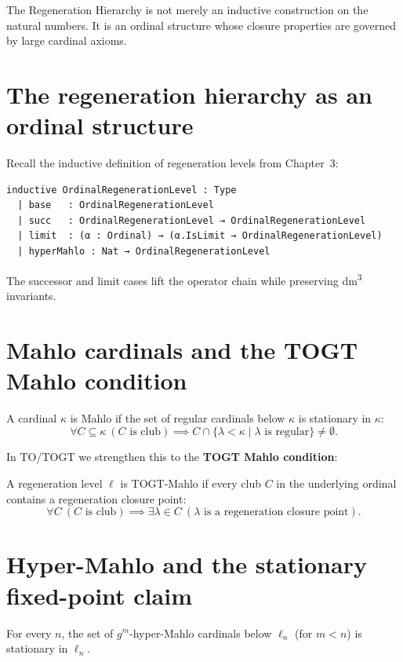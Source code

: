 The Regeneration Hierarchy is not merely an inductive construction on the natural numbers. It is an ordinal structure whose closure properties are governed by large cardinal axioms.

\section{The regeneration hierarchy as an ordinal structure}

Recall the inductive definition of regeneration levels from Chapter~3:

\begin{lstlisting}[language=Lean]
inductive OrdinalRegenerationLevel : Type
  | base   : OrdinalRegenerationLevel
  | succ   : OrdinalRegenerationLevel → OrdinalRegenerationLevel
  | limit  : (α : Ordinal) → (α.IsLimit → OrdinalRegenerationLevel)
  | hyperMahlo : Nat → OrdinalRegenerationLevel
\end{lstlisting}

The successor and limit cases lift the operator chain while preserving dm\textsuperscript{3} invariants.

\section{Mahlo cardinals and the TOGT Mahlo condition}

A cardinal \(\kappa\) is Mahlo if the set of regular cardinals below \(\kappa\) is stationary in \(\kappa\):
\[
\forall C \subseteq \kappa\ (C\text{ is club}) \implies C \cap \{\lambda < \kappa \mid \lambda\text{ is regular}\} \neq \emptyset.
\]

In TO/TOGT we strengthen this to the \textbf{TOGT Mahlo condition}:

\begin{definition}
A regeneration level \(\ell\) is TOGT-Mahlo if every club \(C\) in the underlying ordinal contains a regeneration closure point:
\[
\forall C\ (C\text{ is club}) \implies \exists \lambda \in C\ (\lambda\text{ is a regeneration closure point}).
\]
\end{definition}

\section{Hyper-Mahlo and the stationary fixed-point claim}

\begin{theorem}
For every \(n\), the set of \(g^m\)-hyper-Mahlo cardinals below \(\ell_n\) (for \(m < n\)) is stationary in \(\ell_n\).
\end{theorem}

